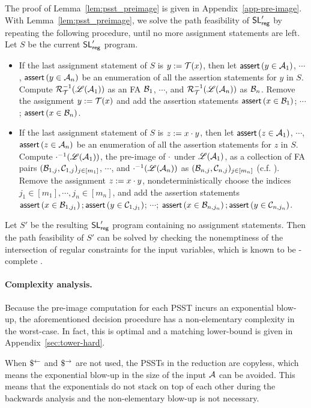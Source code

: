 The proof of Lemma~\ref{lem:psst_preimage} is given in Appendix~\ref{app-pre-image}.
With Lemma~\ref{lem:psst_preimage}, we  solve the path feasibility of $\mathsf{SL}'_{\sf reg}$ by repeating the following procedure, until no more assignment statements are left. Let $S$ be the current $\mathsf{SL}'_{\sf reg}$ program.
\begin{itemize}
\item If the last assignment statement of $S$ is $y:=\mathcal{T}(x)$, then let $\textsf{assert}\left(y \in \mathcal{A}_1\right)$, $\cdots$, $\textsf{assert}\left(y \in \mathcal{A}_n\right)$ be an enumeration of all the assertion statements for $y$ in $S$. Compute $\mathcal{R}^{-1}_{\mathcal{T}}(\mathscr{L}(\mathcal{A}_1))$ as an FA $\mathcal{B}_1$, $\cdots$, and $\mathcal{R}^{-1}_{\mathcal{T}}(\mathscr{L}(\mathcal{A}_n))$ as $\mathcal{B}_n$. Remove  the assignment  $y:=\mathcal{T}(x)$ and add the assertion statements $\textsf{assert}\left(x \in \mathcal{B}_1\right)$; $\cdots$; $\textsf{assert}\left(x \in \mathcal{B}_n\right)$.
%
\item If the last assignment statement of $S$ is $z:=x \cdot y$, then let $\textsf{assert}\left(z \in \mathcal{A}_1\right)$, $\cdots$, $\textsf{assert}\left(z \in \mathcal{A}_n\right)$ be an enumeration of all the assertion statements for $z$ in $S$. Compute $\cdot^{-1}(\mathscr{L}(\mathcal{A}_1))$, the pre-image of $\cdot$ under $\mathscr{L}(\mathcal{A}_1)$, as a collection of FA pairs $(\mathcal{B}_{1,j}, \mathcal{C}_{1,j})_{j \in [m_1]}$, $\cdots$, and $\cdot^{-1}(\mathscr{L}(\mathcal{A}_n))$ as $(\mathcal{B}_{n, j}, \mathcal{C}_{n,j})_{j \in [m_n]}$ (c.f. \cite{CHL+19}). Remove the assignment $z:=x \cdot y$, nondeterministically choose the indices $j_1 \in [m_1], \cdots, j_n \in [m_n]$, and add the assertion statements $\textsf{assert}\left(x \in \mathcal{B}_{1,j_1}\right); \textsf{assert}\left(y \in \mathcal{C}_{1, j_1}\right)$; $\cdots$; $\textsf{assert}\left(x \in \mathcal{B}_{n,j_n}\right); \textsf{assert}\left(y \in \mathcal{C}_{n, j_n}\right)$.
\end{itemize}
Let $S'$ be the resulting $\mathsf{SL}'_{\sf reg}$ program containing no assignment statements. Then the path feasibility of $S'$ can be solved by checking the nonemptiness of the intersection of regular constraints for the input variables, which is known to be \pspace-complete \cite{Kozen77}.


\paragraph*{Complexity analysis.} Because the pre-image computation for each PSST incurs an exponential blow-up, the aforementioned decision procedure has a non-elementary complexity in the worst-case. In fact, this is optimal and a matching lower-bound is given in Appendix~\ref{sec:tower-hard}.

When $\$^{\leftarrow}$ and $\$^{\rightarrow}$ are not used, the PSSTs in the reduction are copyless, which means the exponential blow-up in the size of the input \FA{} $\mathcal{A}$ can be avoided. This means that the exponentials do not stack on top of each other during the backwards analysis and the non-elementary blow-up is not necessary.

